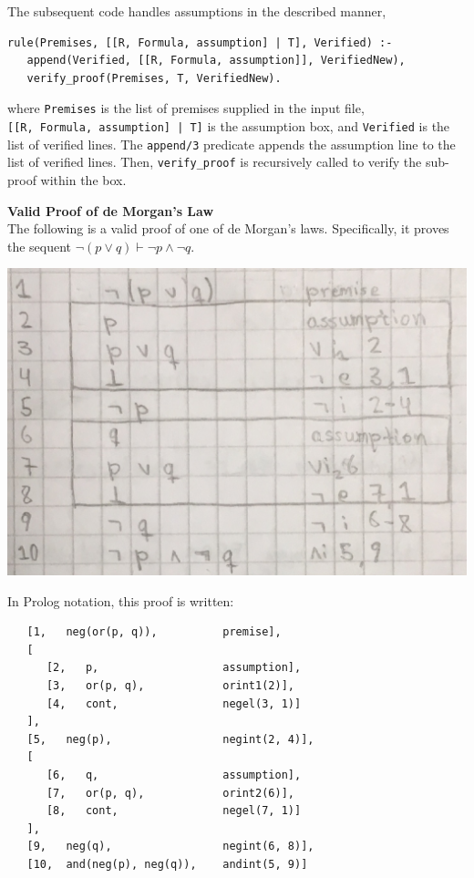 \documentclass[a4paper, 11pt]{article}
\begin{document}
   The subsequent code handles assumptions in the described
   manner,

\begin{verbatim}
rule(Premises, [[R, Formula, assumption] | T], Verified) :-
   append(Verified, [[R, Formula, assumption]], VerifiedNew),
   verify_proof(Premises, T, VerifiedNew).
\end{verbatim}
   
   where \texttt{Premises} is the list of premises supplied 
   in the input file, \\ 
   \texttt{[[R, Formula, assumption] | T]} is the assumption
   box, and \texttt{Verified} is the list of verified lines.
   The \texttt{append/3} predicate appends the assumption line
   to the list of verified lines. Then, \texttt{verify\_proof}
   is recursively called to verify the sub-proof within the
   box.
   
   \textbf{Valid Proof of de Morgan's Law} \\
   The following is a valid proof of one of de Morgan's laws.
   Specifically, it proves the sequent 
   $\neg(p \vee q) \vdash \neg p \wedge \neg q$.
   \bigbreak

   \includegraphics[scale=0.25]{de-morgan-valid}
   
   In Prolog notation, this proof is written:

   \begin{verbatim}
   [1,   neg(or(p, q)),          premise],
   [
      [2,   p,                   assumption],
      [3,   or(p, q),            orint1(2)],
      [4,   cont,                negel(3, 1)]
   ],
   [5,   neg(p),                 negint(2, 4)],
   [
      [6,   q,                   assumption],
      [7,   or(p, q),            orint2(6)],
      [8,   cont,                negel(7, 1)]
   ],
   [9,   neg(q),                 negint(6, 8)],
   [10,  and(neg(p), neg(q)),    andint(5, 9)]
   \end{verbatim}
\end{document}
